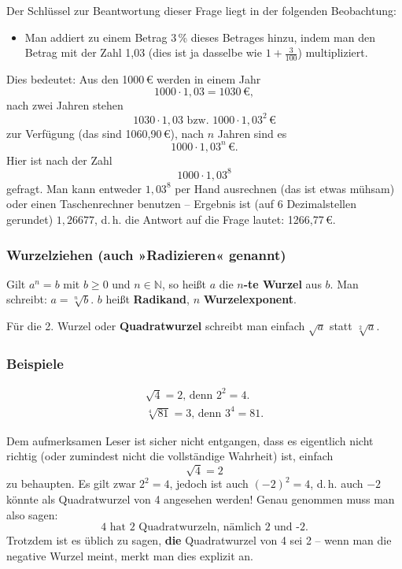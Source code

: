 Der Schlüssel zur Beantwortung dieser Frage liegt in der folgenden Beobachtung:
\begin{itemize}
  \item Man addiert zu einem Betrag 3\,\% dieses Betrages hinzu, indem man den Betrag mit der Zahl 1{,}03 (dies ist ja dasselbe wie $1 + \tfrac{3}{100}$) multipliziert.
\end{itemize}

Dies bedeutet: Aus den 1000\,€ werden in einem Jahr
\[ 1000 \cdot 1{,}03 = 1030\,€ , \]
nach zwei Jahren stehen
\[ 1030 \cdot 1{,}03 \text{ bzw. } 1000 \cdot 1{,}03^2\,€ \]
zur Verfügung (das sind 1060{,}90\,€), nach $n$ Jahren sind es
\[ 1000 \cdot 1{,}03^n\,€ . \]
Hier ist nach der Zahl
\[ 1000 \cdot 1{,}03^8 \]
gefragt. Man kann entweder $1{,}03^8$ per Hand ausrechnen (das ist etwas mühsam) oder einen Taschenrechner benutzen -- Ergebnis ist (auf 6 Dezimalstellen gerundet) $1{,}26677$, d.\,h. die Antwort auf die Frage lautet: 1266{,}77\,€.\beispielende

\subsubsection*{Wurzelziehen (auch »Radizieren« genannt)}

Gilt $a^n = b$ mit $b \geq 0$ und $n \in \mathbb{N}$, so heißt $a$ die \textbf{$n$-te Wurzel} aus $b$. Man schreibt: $a = \sqrt[n]{b}$. $b$ heißt \textbf{Radikand}, $n$ \textbf{Wurzelexponent}.

Für die 2. Wurzel oder \textbf{Quadratwurzel} schreibt man einfach $\sqrt{a}$ statt $\sqrt[2]{a}$.

\subsubsection{Beispiele}

\begin{gather*}\sqrt{4} = 2 \text{, denn } 2^2 = 4 . \\ \sqrt[4]{81} = 3 \text{, denn } 3^4 = 81 .\end{gather*}\beispielende

Dem aufmerksamen Leser ist sicher nicht entgangen, dass es eigentlich nicht richtig (oder zumindest nicht die vollständige Wahrheit) ist, einfach
\[ \sqrt{4} = 2 \]
zu behaupten. Es gilt zwar $2^2 = 4$, jedoch ist auch $(-2)^2 = 4$, d.\,h. auch $-2$ könnte als Quadratwurzel von 4 angesehen werden! Genau genommen muss man also sagen:
\[ \text{4 hat 2 Quadratwurzeln, nämlich 2 und -2.} \]
Trotzdem ist es üblich zu sagen, \textbf{die} Quadratwurzel von 4 sei 2 -- wenn man die negative Wurzel meint, merkt man dies explizit an.

